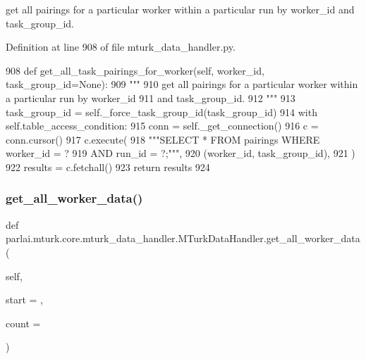 \begin{DoxyVerb}get all pairings for a particular worker within a particular run by worker_id
and task_group_id.
\end{DoxyVerb}
 

Definition at line 908 of file mturk\+\_\+data\+\_\+handler.\+py.


\begin{DoxyCode}
908     \textcolor{keyword}{def }get\_all\_task\_pairings\_for\_worker(self, worker\_id, task\_group\_id=None):
909         \textcolor{stringliteral}{"""}
910 \textcolor{stringliteral}{        get all pairings for a particular worker within a particular run by worker\_id}
911 \textcolor{stringliteral}{        and task\_group\_id.}
912 \textcolor{stringliteral}{        """}
913         task\_group\_id = self.\_force\_task\_group\_id(task\_group\_id)
914         with self.table\_access\_condition:
915             conn = self.\_get\_connection()
916             c = conn.cursor()
917             c.execute(
918                 \textcolor{stringliteral}{"""SELECT * FROM pairings WHERE worker\_id = ?}
919 \textcolor{stringliteral}{                         AND run\_id = ?;"""},
920                 (worker\_id, task\_group\_id),
921             )
922             results = c.fetchall()
923             \textcolor{keywordflow}{return} results
924 
\end{DoxyCode}
\mbox{\label{classparlai_1_1mturk_1_1core_1_1mturk__data__handler_1_1MTurkDataHandler_a188c46e50f06129a289a065809290bf3}} 
\subsubsection{\texorpdfstring{get\+\_\+all\+\_\+worker\+\_\+data()}{get\_all\_worker\_data()}}
{\footnotesize\ttfamily def parlai.\+mturk.\+core.\+mturk\+\_\+data\+\_\+handler.\+M\+Turk\+Data\+Handler.\+get\+\_\+all\+\_\+worker\+\_\+data (\begin{DoxyParamCaption}\item[{}]{self,  }\item[{}]{start = {},  }\item[{}]{count = {} }\end{DoxyParamCaption})}

